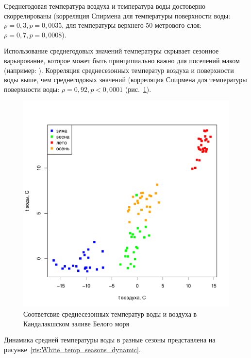 Среднегодовая температура воздуха и температура воды достоверно скоррелированы (корреляция Спирмена для температуры поверхности воды: $\rho = 0,3, p = 0,0035$, для температуры верхнего 50-метрового слоя: $\rho = 0,7, p = 0,0008$).

Использование среднегодовых значений температуры скрывает сезонное варьирование, которое может быть принципиально важно для поселений маком (например: \cite{Beukema_et_al_1998, Beukema_Dekker_2003, Beukema_et_al_2009}). 
Корреляция среднесезонных температур воздуха и поверхности воды выше, чем среднегодовых значений (корреляция Спирмена для температуры поверхности воды: $\rho = 0,92, p < 0,0001$ (рис.~\ref{ris:White_temp_water_vs_air_seasons}). 
	\begin{figure}[p]
    \includegraphics[width=\textwidth]{../temperatures_water_air/temp_air_water1.pdf}
    \caption{Соответсвие среднесезонных температур воды и воздуха в Кандалакшском заливе Белого моря}
    \label{ris:White_temp_water_vs_air_seasons}
	\end{figure}
Динамика средней температуры воды в разные сезоны представлена на рисунке~\ref{ris:White_temp_seasons_dynamic}.
